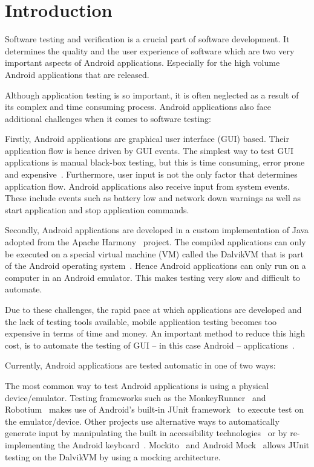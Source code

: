 \documentclass{sig-alternate}
\begin{document}
\section{Introduction}
Software testing and verification is a crucial part of software development. It determines the quality and the user
experience of software which are two very important aspects of Android applications. Especially for the high volume Android applications
that are released. 

Although application testing is so important, it is often neglected as a result of its complex and time consuming process. Android
applications also face additional challenges when it comes to software testing:

Firstly, Android applications are graphical user interface (GUI) based. Their application flow is hence driven by GUI events. The
simplest way to test GUI applications is manual black-box testing, but this is time consuming, error prone and
expensive~\cite{AccessibilityTech}. Furthermore, user input is not the only factor that determines application flow. Android applications
also receive input from system events. These include events such as battery low and network down warnings as well as start application and
stop application commands.

Secondly, Android applications are developed in a custom implementation of Java adopted from the Apache Harmony~\cite{harmony} project. The
compiled applications can only be executed on a special virtual machine (VM) called the DalvikVM that is part of the Android operating
system~\cite{dalvik}. Hence Android applications can only run on a computer in an Android emulator. This makes testing very slow and
difficult to automate.

Due to these challenges, the rapid pace at which applications are developed and the lack of testing tools available, mobile application
testing becomes too expensive in terms of time and money. An important method to reduce this high cost, is to 
automate the testing of GUI -- in this case Android -- applications~\cite{AccessibilityTech}.

Currently, Android applications are tested automatic in one of two ways:

The most common way to test Android applications is using a physical device/emulator. Testing frameworks such as
the MonkeyRunner~\cite{monkey} and Robotium~\cite{robotium} makes use of Android's built-in JUnit framework~\cite{TestingAndroid} to
execute test on the emulator/device. Other projects use alternative ways to automatically generate input by manipulating the built in
accessibility technologies~\cite{AccessibilityTech} or by re-implementing the Android keyboard~\cite{KeyboardModel}. Mockito~\cite{mockito}
and Android Mock~\cite{androidMock} allows JUnit testing on the DalvikVM by using a mocking architecture.
\end{document}
